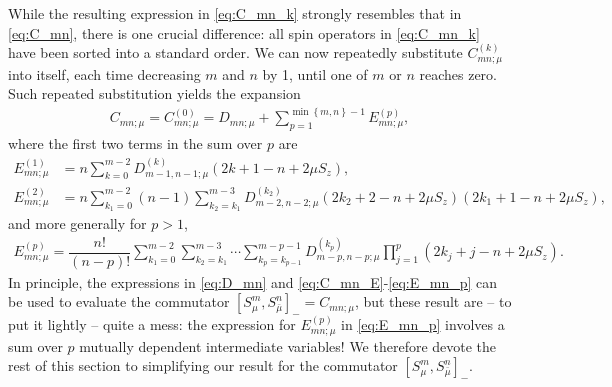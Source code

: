 \documentclass[aps,notitlepage,nofootinbib,11pt]{revtex4-1}
\newcommand{\f}[2]{\dfrac{#1}{#2}} %
\newcommand{\p}[1]{\left(#1\right)} %
\renewcommand{\sp}[1]{\left[#1\right]} %
\renewcommand{\set}[1]{\left\{#1\right\}} %
\newcommand{\bmu}{{\bar\mu}}
\newcommand{\1}{\mathds{1}}
\begin{document}
While the resulting expression in \eqref{eq:C_mn_k} strongly resembles
that in \eqref{eq:C_mn}, there is one crucial difference: all spin
operators in \eqref{eq:C_mn_k} have been sorted into a standard order.
We can now repeatedly substitute $C_{mn;\mu}^{(k)}$ into itself, each
time decreasing $m$ and $n$ by 1, until one of $m$ or $n$ reaches
zero.  Such repeated substitution yields the expansion
\begin{align}
  C_{mn;\mu}
  = C_{mn;\mu}^{(0)}
  = D_{mn;\mu}
  + \sum_{p=1}^{\min\set{m,n}-1} E_{mn;\mu}^{(p)},
  \label{eq:C_mn_E}
\end{align}
where the first two terms in the sum over $p$ are
\begin{align}
  E_{mn;\mu}^{(1)}
  &= n \sum_{k=0}^{m-2} D_{m-1,n-1;\mu}^{(k)}
  \p{2k+1-n+2\mu S_z}, \\
  E_{mn;\mu}^{(2)}
  &= n \sum_{k_1=0}^{m-2} \p{n-1} \sum_{k_2=k_1}^{m-3}
  D_{m-2,n-2;\mu}^{(k_2)}
  \p{2k_2+2-n+2\mu S_z} \p{2k_1+1-n+2\mu S_z},
\end{align}
and more generally for $p>1$,
\begin{align}
  E_{mn;\mu}^{(p)}
  = \f{n!}{\p{n-p}!}
  \sum_{k_1=0}^{m-2} \sum_{k_2=k_1}^{m-3} \cdots\sum_{k_p=k_{p-1}}^{m-p-1}
  D_{m-p,n-p;\mu}^{(k_p)} \prod_{j=1}^p \p{2k_j+j-n+2\mu S_z}.
  \label{eq:E_mn_p}
\end{align}
In principle, the expressions in \eqref{eq:D_mn} and
\eqref{eq:C_mn_E}-\eqref{eq:E_mn_p} can be used to evaluate the
commutator $\sp{S_\mu^m,S_\bmu^n}_- = C_{mn;\mu}$, but these result
are -- to put it lightly -- quite a mess: the expression for
$E_{mn;\mu}^{(p)}$ in \eqref{eq:E_mn_p} involves a sum over $p$
mutually dependent intermediate variables!  We therefore devote the
rest of this section to simplifying our result for the commutator
$\sp{S_\mu^m,S_\bmu^n}_-$.
\end{document}
